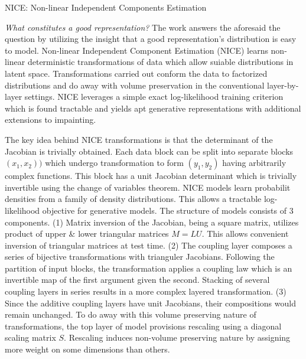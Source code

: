 \documentclass[11pt,letterpaper]{article}
\begin{document}
\begin{center}
  \large{NICE: Non-linear Independent Components Estimation}
\end{center}

\textit{What constitutes a good representation?} The work answers the aforesaid the question by utilizing the insight that a good representation's distribution is easy to model. Non-linear Independent Component Estimation (NICE) learns non-linear deterministic transformations of data which allow suiable distributions in latent space. Transformations carried out conform the data to factorized distributions and do away with volume preservation in the conventional layer-by-layer settings. NICE leverages a simple exact log-likelihood training criterion which is found tractable and yields apt generative representations with additional extensions to impainting.

The key idea behind NICE transformations is that the determinant of the Jacobian is trivially obtained.  Each data block can be split into separate blocks $(x_{1},x_{2}))$ which undergo transformation to form $(y_{1},y_{2})$ having arbitrarily complex functions. This block has a unit Jacobian determinant which is trivially invertible using the change of variables theorem. NICE models learn probabilit densities from a family of density distributions. This allows a tractable log-likelihood objective for generative models. The structure of models consists of 3 components. (1) Matrix inversion of the Jacobian, being a square matrix, utilizes product of upper \& lower triangular matrices $M = LU$. This allows convenient inversion of triangular matrices at test time. (2) The coupling layer composes a series of bijective transformations with trianguler Jacobians. Following the partition of input blocks, the transformation applies a coupling law which is an invertible map of the first argument given the second. Stacking of several coupling layers in series results in a more complex layered transformation. (3) Since the additive coupling layers have unit Jacobians, their compositions would remain unchanged. To do away with this volume preserving nature of transformations, the top layer of model provisions rescaling using a diagonal scaling matrix $S$. Rescaling induces non-volume preserving nature by assigning more weight on some dimensions than others. 
\end{document}
